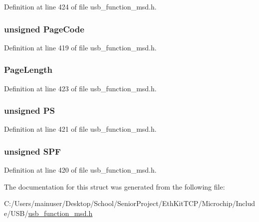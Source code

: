 Definition at line 424 of file usb\+\_\+function\+\_\+msd.\+h.

\hypertarget{structt_mode_page_a229669906e282bdb7f7dc755fb1ebe80}{}
\subsubsection[{Page\+Code}]{\setlength{\rightskip}{0pt plus 5cm}unsigned Page\+Code}\label{structt_mode_page_a229669906e282bdb7f7dc755fb1ebe80}


Definition at line 419 of file usb\+\_\+function\+\_\+msd.\+h.

\hypertarget{structt_mode_page_a40d0d13549ac834ee9aade48efafe4bc}{}
\subsubsection[{Page\+Length}]{ Page\+Length}\label{structt_mode_page_a40d0d13549ac834ee9aade48efafe4bc}


Definition at line 423 of file usb\+\_\+function\+\_\+msd.\+h.

\hypertarget{structt_mode_page_a64b873122caea78d170d453815ba2b6d}{}
\subsubsection[{P\+S}]{\setlength{\rightskip}{0pt plus 5cm}unsigned P\+S}\label{structt_mode_page_a64b873122caea78d170d453815ba2b6d}


Definition at line 421 of file usb\+\_\+function\+\_\+msd.\+h.

\hypertarget{structt_mode_page_aa7ac799bd74741a57afbbe1e60144baf}{}
\subsubsection[{S\+P\+F}]{\setlength{\rightskip}{0pt plus 5cm}unsigned S\+P\+F}\label{structt_mode_page_aa7ac799bd74741a57afbbe1e60144baf}


Definition at line 420 of file usb\+\_\+function\+\_\+msd.\+h.



The documentation for this struct was generated from the following file\+:\begin{DoxyCompactItemize}
\item 
C\+:/\+Users/mainuser/\+Desktop/\+School/\+Senior\+Project/\+Eth\+Kit\+T\+C\+P/\+Microchip/\+Include/\+U\+S\+B/\hyperlink{usb__function__msd_8h}{usb\+\_\+function\+\_\+msd.\+h}\end{DoxyCompactItemize}
